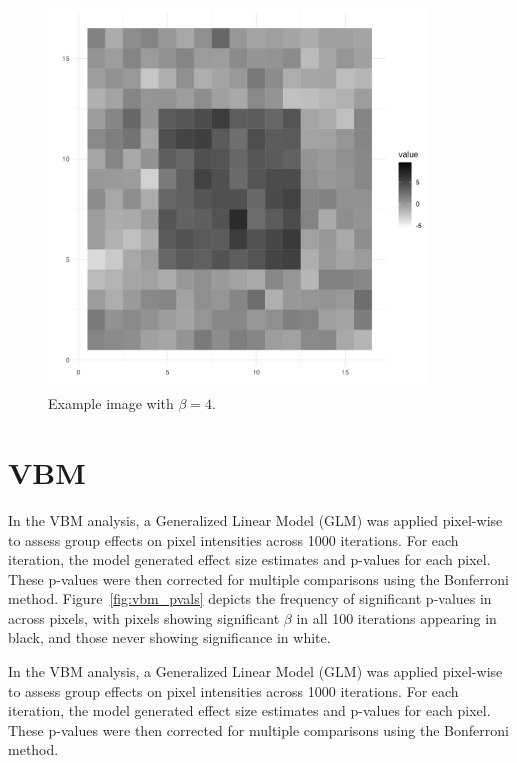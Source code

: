 \documentclass[12pt]{article}
\begin{document}
\begin{figure}[H]
    \begin{minipage}[b]{0.45\textwidth}
        \centering
        \includegraphics[width=0.9\textwidth]{../Figures/ex_image_4.png}
        \caption{Example image with \(\beta = 4\).}
        \label{fig:image3}
    \end{minipage}
\end{figure}

\section*{VBM}

In the VBM analysis, a Generalized Linear Model (GLM) was applied pixel-wise to assess group effects on pixel intensities across 1000 iterations. For each iteration, the model generated effect size estimates and p-values for each pixel. These p-values were then corrected for multiple comparisons using the Bonferroni method. Figure~\ref{fig:vbm_pvals} depicts the frequency of significant p-values in across pixels, with pixels showing significant \(\beta\) in all 100 iterations appearing in black, and those never showing significance in white.

In the VBM analysis, a Generalized Linear Model (GLM) was applied pixel-wise to assess group effects on pixel intensities across 1000 iterations. For each iteration, the model generated effect size estimates and p-values for each pixel. These p-values were then corrected for multiple comparisons using the Bonferroni method.
\end{document}
